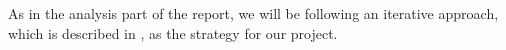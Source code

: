 As in the analysis part of the report, we will be following an iterative approach, which is described in \cite{mathiassen2001objektorienteret}, as the strategy for our project.